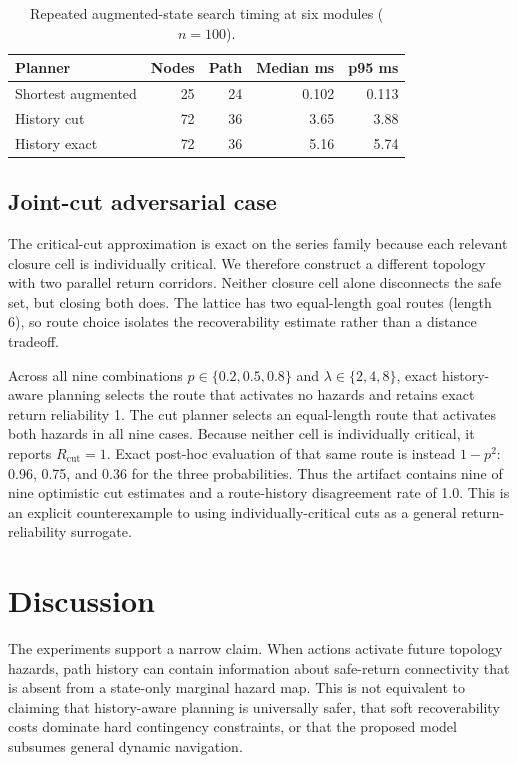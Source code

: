 \documentclass[conference]{IEEEtran}
\begin{document}
\begin{table}[t]
\centering
\caption{Repeated augmented-state search timing at six modules ($n=100$).}
\label{tab:scaling}
\begin{tabular}{lrrrr}
\toprule
Planner & Nodes & Path & Median ms & p95 ms\\
\midrule
Shortest augmented & 25 & 24 & 0.102 & 0.113\\
History cut & 72 & 36 & 3.65 & 3.88\\
History exact & 72 & 36 & 5.16 & 5.74\\
\bottomrule
\end{tabular}
\end{table}

\subsection{Joint-cut adversarial case}
The critical-cut approximation is exact on the series family because each relevant closure cell is individually critical. We therefore construct a different topology with two parallel return corridors. Neither closure cell alone disconnects the safe set, but closing both does. The lattice has two equal-length goal routes (length 6), so route choice isolates the recoverability estimate rather than a distance tradeoff.

Across all nine combinations $p\in\{0.2,0.5,0.8\}$ and $\lambda\in\{2,4,8\}$, exact history-aware planning selects the route that activates no hazards and retains exact return reliability 1. The cut planner selects an equal-length route that activates both hazards in all nine cases. Because neither cell is individually critical, it reports $R_{\mathrm{cut}}=1$. Exact post-hoc evaluation of that same route is instead $1-p^2$: 0.96, 0.75, and 0.36 for the three probabilities. Thus the artifact contains nine of nine optimistic cut estimates and a route-history disagreement rate of 1.0. This is an explicit counterexample to using individually-critical cuts as a general return-reliability surrogate.

\section{Discussion}
The experiments support a narrow claim. When actions activate future topology hazards, path history can contain information about safe-return connectivity that is absent from a state-only marginal hazard map. This is not equivalent to claiming that history-aware planning is universally safer, that soft recoverability costs dominate hard contingency constraints, or that the proposed model subsumes general dynamic navigation.
\end{document}
